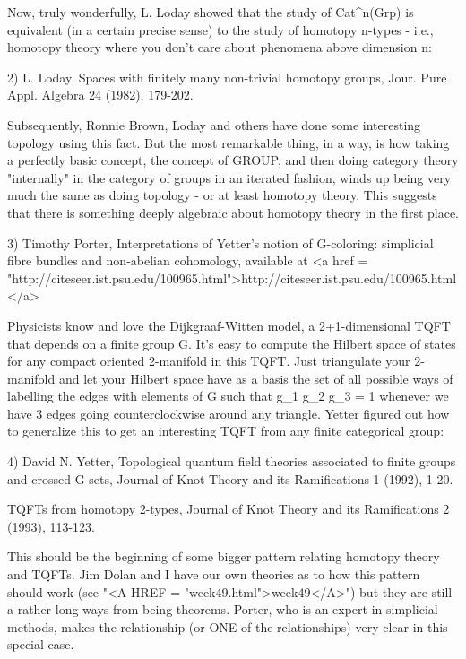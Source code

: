 Now, truly wonderfully, L. Loday showed that the study of
Cat^{n}(Grp) is 
equivalent (in a certain precise sense) to the study of homotopy 
n-types - i.e., homotopy theory where you don't care about phenomena
above dimension n:

2) L. Loday, Spaces with finitely many non-trivial homotopy groups, Jour. 
Pure Appl. Algebra 24 (1982), 179-202.

Subsequently, Ronnie Brown, Loday and others have done some interesting 
topology using this fact.  But the most remarkable thing, in a way, is how 
taking a perfectly basic concept, the concept of GROUP, and then doing 
category theory "internally" in the category of groups in an iterated 
fashion, winds up being very much the same as doing topology - or at least 
homotopy theory.  This suggests that there is something deeply algebraic 
about homotopy theory in the first place.

3) Timothy Porter, Interpretations of Yetter's notion of G-coloring: 
simplicial fibre bundles and non-abelian cohomology, available at
<a href = "http://citeseer.ist.psu.edu/100965.html">http://citeseer.ist.psu.edu/100965.html</a>

Physicists know and love the Dijkgraaf-Witten model, a 2+1-dimensional TQFT 
that depends on a finite group G.  It's easy to compute the Hilbert space of 
states for any compact oriented 2-manifold in this TQFT.  Just triangulate 
your 2-manifold and let your Hilbert space have as a basis the set of all 
possible ways of labelling the edges with elements of G such that 
g_{1} g_{2} g_{3} = 1 whenever we have 3 edges going counterclockwise
around any triangle.  Yetter figured out how to generalize this to get an 
interesting TQFT from any finite categorical group:

4)  David N. Yetter, Topological quantum field theories associated to 
finite groups and crossed G-sets, Journal of Knot Theory and its 
Ramifications 1 (1992), 1-20.

TQFTs from homotopy 2-types, Journal of Knot Theory and its Ramifications 2 
(1993), 113-123.

This should be the beginning of some bigger pattern relating homotopy theory
and TQFTs.   Jim Dolan and I have our own theories as to how this pattern 
should work (see "<A HREF = "week49.html">week49</A>") but they are still a rather long ways from being 
theorems.  Porter, who is an expert in simplicial methods, makes the 
relationship (or ONE of the relationships) very clear in this special case.

